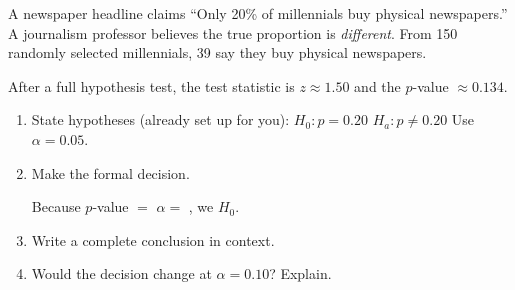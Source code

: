 \documentclass[10pt]{article}
\begin{document}
\namedateperiod

\vspace{0.15in}

A newspaper headline claims ``Only 20\% of millennials buy physical newspapers.'' A
journalism professor believes the true proportion is \emph{different}. From 150 randomly
selected millennials, 39 say they buy physical newspapers.

After a full hypothesis test, the test statistic is $z \approx 1.50$ and the $p$-value
$\approx 0.134$.

\begin{enumerate}
  \item State hypotheses (already set up for you):
        $H_0: p = 0.20$ \quad $H_a: p \ne 0.20$ \quad Use $\alpha = 0.05$.

  \item Make the formal decision.

        Because $p$-value $=$ \blank{2cm} \blank{1.5cm} $\alpha =$ \blank{1.5cm}, we \blank{4cm} $H_0$.

  \item Write a complete conclusion in context.

  \item Would the decision change at $\alpha = 0.10$? Explain.
\end{enumerate}
\end{document}
